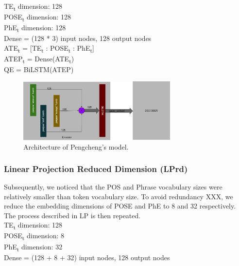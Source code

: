 \documentclass{IEEEtran}
\begin{document}
        \hspace*{-3.5mm}TE\textsubscript{t} dimension: 128 \\
        POSE\textsubscript{t} dimension: 128 \\
        PhE\textsubscript{t} dimension: 128 \\
        Dense = (128 * 3) input nodes, 128 output nodes \\ 

        \hspace*{-3.5mm}ATE\textsubscript{t} = [TE\textsubscript{t} : 
        POSE\textsubscript{t} : PhE\textsubscript{t}] \\
        ATEP\textsubscript{t} = Dense(ATE\textsubscript{t}) \\
        QE = BiLSTM(ATEP) \\

        \begin{figure}[h]
          \centering
          \includegraphics[width=8cm]{lp.png}
          \caption{Architecture of Pengcheng's model.}
          \label{fig:lp}
        \end{figure}

        \subsubsection{Linear Projection Reduced Dimension (LPrd)} 
        Subsequently, we noticed that the POS and Phrase vocabulary sizes were relatively smaller
        than token vocabulary size. To avoid redundancy XXX, we reduce the embedding dimensions
        of POSE and PhE to 8 and 32 respectively. The process described in LP is then repeated. \\

        \hspace*{-3.5mm}TE\textsubscript{t} dimension: 128 \\
        POSE\textsubscript{t} dimension: 8 \\
        PhE\textsubscript{t} dimension: 32 \\
        Dense = (128 + 8 + 32) input nodes, 128 output nodes \\ 
\end{document}
